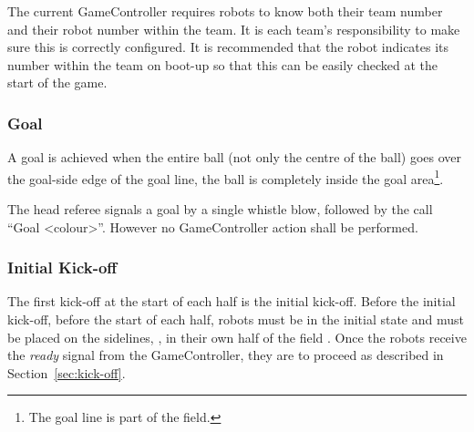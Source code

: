 The current GameController requires robots to know both their team number and their robot number within the team. It is each team's responsibility to make sure this is correctly configured. It is recommended that the robot indicates its number within the team on boot-up so that this can be easily checked at the start of the game.

\subsubsection{Goal}
\label{sec:goal}
A goal  is achieved when the entire ball (not only the centre of the ball) goes over the goal-side edge of the goal line, \ie the ball is completely inside the goal area\footnote{The goal line is part of the field.}.


The head referee signals a goal by a single whistle blow, followed by the call ``Goal \textless colour\textgreater''. However no GameController action shall be performed.



\subsubsection{Initial Kick-off}
\label{sec:initial-kick-off}

The first kick-off at the start of each half is the initial kick-off.
Before the initial kick-off, \ie before the start of each half,  robots must be in the initial state and must be placed on the sidelines, , in their own half of the field . 
Once the robots receive the \emph{ready} signal from the GameController, they are to proceed as described in Section~\ref{sec:kick-off}.

